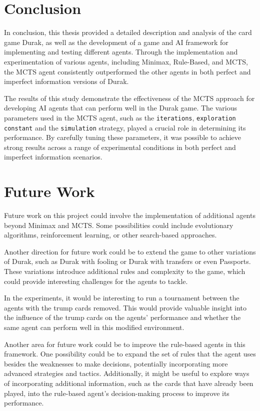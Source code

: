 \chapter*{Conclusion}

In conclusion, this thesis provided a detailed description and analysis of the card game Durak, as well as the development of a game and AI framework for implementing and testing different agents. Through the implementation and experimentation of various agents, including Minimax, Rule-Based, and MCTS, the MCTS agent consistently outperformed the other agents in both perfect and imperfect information versions of Durak.

The results of this study demonstrate the effectiveness of the MCTS approach for developing AI agents that can perform well in the Durak game. The various parameters used in the MCTS agent, such as the \texttt{iterations}, \texttt{exploration constant} and the \texttt{simulation} strategy, played a crucial role in determining its performance. By carefully tuning these parameters, it was possible to achieve strong results across a range of experimental conditions in both perfect and imperfect information scenarios.

\chapter*{Future Work}

Future work on this project could involve the implementation of additional agents beyond Minimax and MCTS. Some possibilities could include evolutionary algorithms, reinforcement learning, or other search-based approaches.

Another direction for future work could be to extend the game to other variations of Durak, such as Durak with fooling or Durak with transfers or even Passports. These variations introduce additional rules and complexity to the game, which could provide interesting challenges for the agents to tackle.

In the experiments, it would be interesting to run a tournament between the agents with the trump cards removed. This would provide valuable insight into the influence of the trump cards on the agents' performance and whether the same agent can perform well in this modified environment.

Another area for future work could be to improve the rule-based agents in this framework. One possibility could be to expand the set of rules that the agent uses besides the weaknesses to make decisions, potentially incorporating more advanced strategies and tactics. Additionally, it might be useful to explore ways of incorporating additional information, such as the cards that have already been played, into the rule-based agent's decision-making process to improve its performance.

